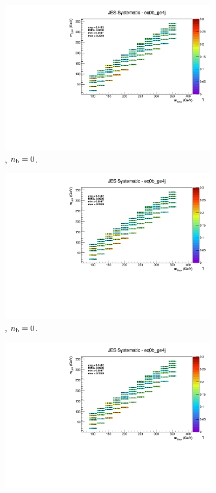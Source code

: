 \begin{figure}[ht!]
\begin{subfigure}[b]{0.32\textwidth}
    \includegraphics[width=\textwidth, page=12]{Figs/sms/t2cc/v37/systs_v2/T2cc_JES_eq0b_ge4j.pdf}
    \caption{\njhigh, $n_{\text{b}} = 0$.}
  \end{subfigure}
  \begin{subfigure}[b]{0.32\textwidth}
    \includegraphics[width=\textwidth, page=8]{Figs/sms/t2cc/v37/systs_v2/T2cc_JES_eq0b_ge4j.pdf}
    \caption{\njhigh, $n_{\text{b}} = 0$.}
  \end{subfigure}
  \begin{subfigure}[b]{0.32\textwidth}
    \includegraphics[width=\textwidth, page=1]{Figs/sms/t2cc/v37/systs_v2/T2cc_JES_eq0b_ge4j.pdf}

\end{subfigure}
\end{figure}
